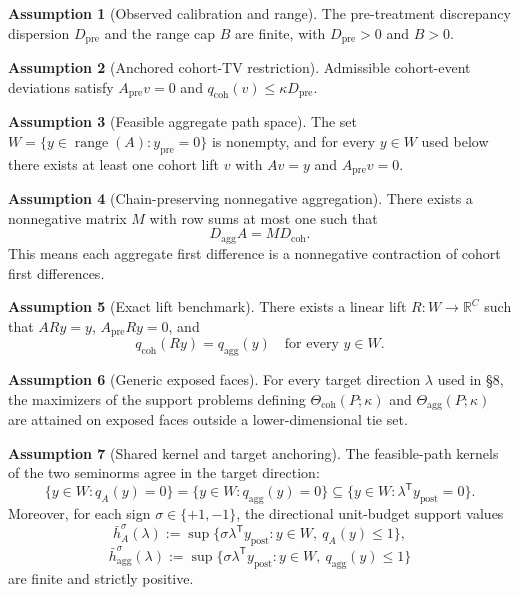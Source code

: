 \documentclass[11pt]{article}
\newcommand{\transpose}{\mathsf{T}}
\newcommand{\R}{\mathbb{R}}
\theoremstyle{definition}
\newtheorem{assumption}{Assumption}
\theoremstyle{plain}
\theoremstyle{remark}
\begin{document}
\begin{assumption}[Observed calibration and range]\label{ass:calibration}
The pre-treatment discrepancy dispersion \(D_{\mathrm{pre}}\) and the range cap \(B\) are finite, with \(D_{\mathrm{pre}}>0\) and \(B>0\).
\end{assumption}

\begin{assumption}[Anchored cohort-TV restriction]\label{ass:cohtv}
Admissible cohort-event deviations satisfy \(A_{\mathrm{pre}}v=0\) and \(q_{\mathrm{coh}}(v)\le \kappa D_{\mathrm{pre}}\).
\end{assumption}

\begin{assumption}[Feasible aggregate path space]\label{ass:feasible}
The set \(W=\{y\in\operatorname{range}(A): y_{\mathrm{pre}}=0\}\) is nonempty, and for every \(y\in W\) used below there exists at least one cohort lift \(v\) with \(Av=y\) and \(A_{\mathrm{pre}}v=0\).
\end{assumption}

\begin{assumption}[Chain-preserving nonnegative aggregation]\label{ass:nonnegative}
There exists a nonnegative matrix \(M\) with row sums at most one such that
\[
D_{\mathrm{agg}}A = M D_{\mathrm{coh}}.
\]
This means each aggregate first difference is a nonnegative contraction of cohort first differences.
\end{assumption}

\begin{assumption}[Exact lift benchmark]\label{ass:lift}
There exists a linear lift \(R:W\to\R^C\) such that \(ARy=y\), \(A_{\mathrm{pre}}Ry=0\), and
\[
q_{\mathrm{coh}}(Ry)=q_{\mathrm{agg}}(y)
\quad\text{for every } y\in W.
\]
\end{assumption}

\begin{assumption}[Generic exposed faces]\label{ass:faces}
For every target direction \(\lambda\) used in \S8, the maximizers of the support problems defining \(\Theta_{\mathrm{coh}}(P;\kappa)\) and \(\Theta_{\mathrm{agg}}(P;\kappa)\) are attained on exposed faces outside a lower-dimensional tie set.
\end{assumption}

\begin{assumption}[Shared kernel and target anchoring]\label{ass:anchor}
The feasible-path kernels of the two seminorms agree in the target direction:
\[
\{y\in W:q_A(y)=0\}
=
\{y\in W:q_{\mathrm{agg}}(y)=0\}
\subseteq
\{y\in W:\lambda^\transpose y_{\mathrm{post}}=0\}.
\]
Moreover, for each sign \(\sigma\in\{+1,-1\}\), the directional unit-budget support values
\[
\bar h_A^\sigma(\lambda)
:=
\sup\{\sigma\lambda^\transpose y_{\mathrm{post}}: y\in W,\ q_A(y)\le 1\},
\]
\[
\bar h_{\mathrm{agg}}^\sigma(\lambda)
:=
\sup\{\sigma\lambda^\transpose y_{\mathrm{post}}: y\in W,\ q_{\mathrm{agg}}(y)\le 1\}
\]
are finite and strictly positive.
\end{assumption}
\end{document}
